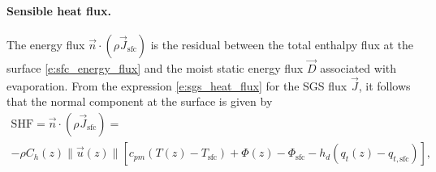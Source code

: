 \documentclass{article}
\begin{document}
\paragraph{Sensible heat flux.} The energy flux $\vec{n} \cdot (\rho \vec{J}_{\mathrm{sfc}})$ is the residual between the total enthalpy flux at the surface \eqref{e:sfc_energy_flux} and the moist static energy flux $\vec{D}$ associated with evaporation. From the expression \eqref{e:sgs_heat_flux} for the SGS flux $\vec{J}$, it follows that the normal component at the surface is given by 
\begin{multline}\label{e:sfc_SHF}
    \mathrm{SHF} = \vec{n} \cdot (\rho \vec{J}_{\mathrm{sfc}}) =
    \\ -\rho C_h(z) \| \vec{u}(z) \| \left[ c_{pm} (T(z) - T_\mathrm{sfc}) + \Phi(z) - \Phi_\mathrm{sfc}
    - h_d (q_t(z) - q_{t, \mathrm{sfc}})  \right],
\end{multline}
\end{document}
